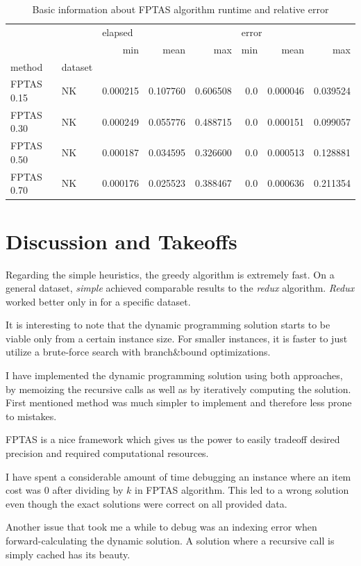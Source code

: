 \documentclass[a4paper,10pt]{article}
\begin{document}
\begin{table}[!htb]
\centering
\begin{tabular}{llrrrrrr}
\toprule
                &    & \multicolumn{3}{l}{elapsed} & \multicolumn{3}{l}{error} \\
                &    &       min &      mean &       max &   min &      mean &       max \\
method & dataset &           &           &           &       &           &           \\
\midrule
FPTAS 0.15 & NK &  0.000215 &  0.107760 &  0.606508 &   0.0 &  0.000046 &  0.039524 \\
FPTAS 0.30 & NK &  0.000249 &  0.055776 &  0.488715 &   0.0 &  0.000151 &  0.099057 \\
FPTAS 0.50 & NK &  0.000187 &  0.034595 &  0.326600 &   0.0 &  0.000513 &  0.128881 \\
FPTAS 0.70 & NK &  0.000176 &  0.025523 &  0.388467 &   0.0 &  0.000636 &  0.211354 \\
\bottomrule
\end{tabular}
\caption{Basic information about FPTAS algorithm runtime and relative error}
\label{fptas_table}
\end{table}

\section{Discussion and Takeoffs}
Regarding the simple heuristics, the greedy algorithm is extremely fast. On a general dataset, \emph{simple} achieved comparable results to the \emph{redux} algorithm. \emph{Redux} worked better only in for a specific dataset.

It is interesting to note that the dynamic programming solution starts to be viable only from a certain instance size. For smaller instances, it is faster to just utilize a brute-force search with branch\&bound optimizations.

I have implemented the dynamic programming solution using both approaches, by memoizing the recursive calls as well as by iteratively computing the solution. First mentioned method was much simpler to implement and therefore less prone to mistakes.

FPTAS is a nice framework which gives us the power to easily tradeoff desired precision and required computational resources.

I have spent a considerable amount of time debugging an instance where an item cost was $0$ after dividing by $k$ in FPTAS algorithm. This led to a wrong solution even though the exact solutions were correct on all provided data.

Another issue that took me a while to debug was an indexing error when forward-calculating the dynamic solution. A solution where a recursive call is simply cached has its beauty.
\end{document}
